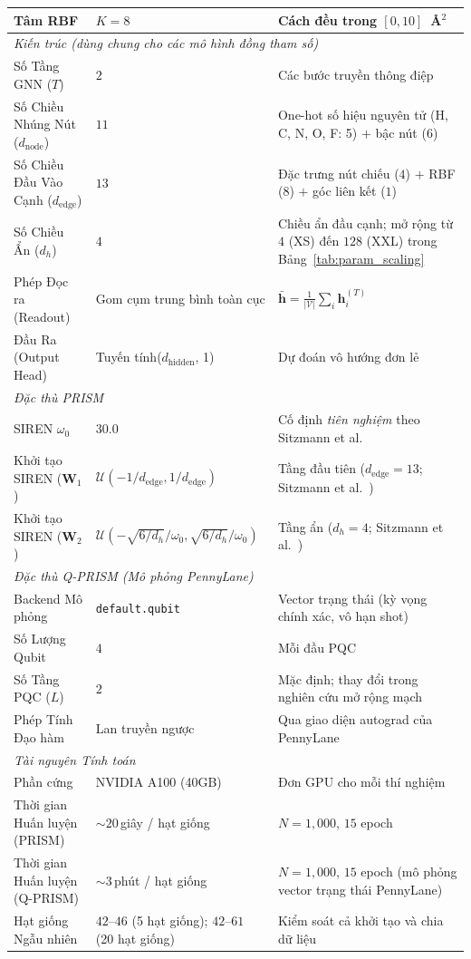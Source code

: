\begin{table}[t]
{\begin{tabular}{lll}
\quad Tâm RBF & $K = 8$ & Cách đều trong $[0, 10]$~\AA$^2$ \\
\midrule
\multicolumn{3}{l}{\textit{Kiến trúc (dùng chung cho các mô hình đồng tham số)}} \\
\quad Số Tầng GNN ($T$) & $2$ & Các bước truyền thông điệp \\
\quad Số Chiều Nhúng Nút ($d_{\mathrm{node}}$) & $11$ & One-hot số hiệu nguyên tử (H, C, N, O, F: 5) $+$ bậc nút (6) \\
\quad Số Chiều Đầu Vào Cạnh ($d_{\mathrm{edge}}$) & $13$ & Đặc trưng nút chiếu ($4$) $+$ RBF ($8$) $+$ góc liên kết ($1$) \\
\quad Số Chiều Ẩn ($d_h$) & $4$ & Chiều ẩn đầu cạnh; mở rộng từ $4$ (XS) đến $128$ (XXL) trong Bảng~\ref{tab:param_scaling} \\
\quad Phép Đọc ra (Readout) & Gom cụm trung bình toàn cục & $\bar{\mathbf{h}} = \frac{1}{|\mathcal{V}|}\sum_{i} \mathbf{h}_i^{(T)}$ \\
\quad Đầu Ra (Output Head) & Tuyến tính($d_{\mathrm{hidden}}$, 1) & Dự đoán vô hướng đơn lẻ \\
\midrule
\multicolumn{3}{l}{\textit{Đặc thù PRISM}} \\
\quad SIREN $\omega_0$ & $30.0$ & Cố định \textit{tiên nghiệm} theo Sitzmann et al.~\cite{sitzmann2020siren} \\
\quad Khởi tạo SIREN ($\mathbf{W}_1$) & $\mathcal{U}(-1/d_{\mathrm{edge}}, 1/d_{\mathrm{edge}})$ & Tầng đầu tiên ($d_{\mathrm{edge}} = 13$; Sitzmann et al.~\cite{sitzmann2020siren}) \\
\quad Khởi tạo SIREN ($\mathbf{W}_2$) & $\mathcal{U}(-\sqrt{6/d_h}/\omega_0, \sqrt{6/d_h}/\omega_0)$ & Tầng ẩn ($d_h = 4$; Sitzmann et al.~\cite{sitzmann2020siren}) \\
\midrule
\multicolumn{3}{l}{\textit{Đặc thù Q-PRISM (Mô phỏng PennyLane)}} \\
\quad Backend Mô phỏng & \texttt{default.qubit} & Vector trạng thái (kỳ vọng chính xác, vô hạn shot) \\
\quad Số Lượng Qubit & $4$ & Mỗi đầu PQC \\
\quad Số Tầng PQC ($L$) & $2$ & Mặc định; thay đổi trong nghiên cứu mở rộng mạch \\
\quad Phép Tính Đạo hàm & Lan truyền ngược & Qua giao diện autograd của PennyLane \\
\midrule
\multicolumn{3}{l}{\textit{Tài nguyên Tính toán}} \\
\quad Phần cứng & NVIDIA A100 (40GB) & Đơn GPU cho mỗi thí nghiệm \\
\quad Thời gian Huấn luyện (PRISM) & $\sim 20$\,giây / hạt giống & $N = 1{,}000$, $15$ epoch \\
\quad Thời gian Huấn luyện (Q-PRISM) & $\sim 3$\,phút / hạt giống & $N = 1{,}000$, $15$ epoch (mô phỏng vector trạng thái PennyLane) \\
\quad Hạt giống Ngẫu nhiên & $42$--$46$ (5 hạt giống); $42$--$61$ (20 hạt giống) & Kiểm soát cả khởi tạo và chia dữ liệu \\
\bottomrule
\end{tabular}%
}
\end{table}

